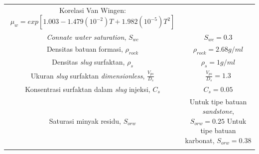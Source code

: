 \documentclass[
]{book}
\begin{document}
\begin{longtable}[]{@{}cc@{}}
\begin{minipage}[t]{0.47\columnwidth}
Korelasi Van Wingen: \(\mu_w = exp[1.003-1.479(10^{-2})T+1.982(10^{-5})T^2]\)\strut
\end{minipage}\tabularnewline
\begin{minipage}[t]{0.47\columnwidth}\centering
\emph{Connate water saturation}, \(S_{wc}\)\strut
\end{minipage} & \begin{minipage}[t]{0.47\columnwidth}\centering
\(S_{wc}=0.3\)\strut
\end{minipage}\tabularnewline
\begin{minipage}[t]{0.47\columnwidth}\centering
Densitas batuan formasi, \(\rho_{rock}\)\strut
\end{minipage} & \begin{minipage}[t]{0.47\columnwidth}\centering
\(\rho_{rock}=2.68g/ml\)\strut
\end{minipage}\tabularnewline
\begin{minipage}[t]{0.47\columnwidth}\centering
Densitas \emph{slug} surfaktan, \(\rho_{s}\)\strut
\end{minipage} & \begin{minipage}[t]{0.47\columnwidth}\centering
\(\rho_{s}=1g/ml\)\strut
\end{minipage}\tabularnewline
\begin{minipage}[t]{0.47\columnwidth}\centering
Ukuran \emph{slug} surfaktan \emph{dimensionless}, \(\frac{V_{ps}}{D_s}\)\strut
\end{minipage} & \begin{minipage}[t]{0.47\columnwidth}\centering
\(\frac{V_{ps}}{D_s}=1.3\)\strut
\end{minipage}\tabularnewline
\begin{minipage}[t]{0.47\columnwidth}\centering
Konsentrasi surfaktan dalam \emph{slug} injeksi, \(C_s\)\strut
\end{minipage} & \begin{minipage}[t]{0.47\columnwidth}\centering
\(C_s=0.05\)\strut
\end{minipage}\tabularnewline
\begin{minipage}[t]{0.47\columnwidth}\centering
Saturasi minyak residu, \(S_{orw}\)\strut
\end{minipage} & \begin{minipage}[t]{0.47\columnwidth}\centering
Untuk tipe batuan \emph{sandstone}, \(S_{orw}=0.25\) Untuk tipe batuan karbonat, \(S_{orw}=0.38\)\strut
\end{minipage}\tabularnewline
\begin{minipage}[t]{0.47\columnwidth}\centering

\end{minipage}
\end{longtable}
\end{document}
